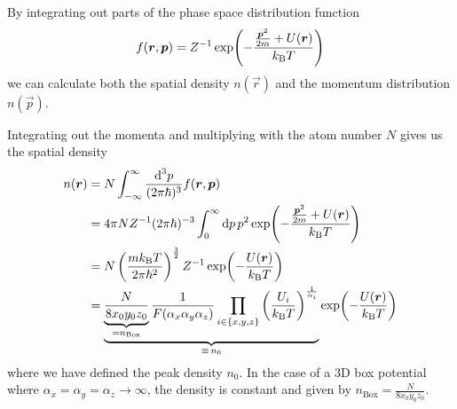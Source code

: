 By integrating out parts of the phase space distribution function
\begin{equation*}
    f(\boldsymbol{r},\boldsymbol{p}) = Z^{-1}\exp\!{\left(-\frac{\frac{\boldsymbol{p}^2}{2m} + U(\boldsymbol{r})}{k_\text{B} T}\right)}
\end{equation*}
we can calculate both the spatial density $n(\vec{r})$ and the momentum distribution $n(\vec{p})$.

Integrating out the momenta and multiplying with the atom number $N$ gives us the spatial density
\begin{align}
    n(\boldsymbol{r}) &= N\int_{-\infty}^\infty \frac{\text{d}^{3}p}{(2\pi\hbar)^3} f(\boldsymbol{r},\boldsymbol{p}) \nonumber \\
    &= 4\pi N Z^{-1} (2\pi\hbar)^{-3} \int_0^\infty \text{d}p\, p^2 \exp\!\left(-\frac{\frac{\boldsymbol{p}^2}{2m} + U(\boldsymbol{r})}{k_\text{B} T}\right) \nonumber \\
    &= N \left(\frac{mk_\text{B} T}{2\pi\hbar^2}\right)^{\frac{3}{2}} Z^{-1} \exp\!\left(-\frac{U(\boldsymbol{r})}{k_\text{B} T}\right) \nonumber \\
    &= \underbrace{\underbrace{\frac{N}{8x_0y_0z_0}}_{=n_\text{Box}}\frac{1}{F(\alpha_x\alpha_y\alpha_z)}\prod_{i\in\{x,y,z\}}\left(\frac{U_i}{k_\text{B} T}\right)^{\frac{1}{\alpha_i}}}_{\equiv\, n_0} \exp\!\left(-\frac{U(\boldsymbol{r})}{k_\text{B} T}\right) \label{eq:spatial_density}
\end{align}
where we have defined the peak density $n_0$. In the case of a 3D box potential where $\alpha_x = \alpha_y = \alpha_z \rightarrow \infty$, the density is constant and given by $n_\text{Box} = \frac{N}{8x_0y_0z_0}$.

